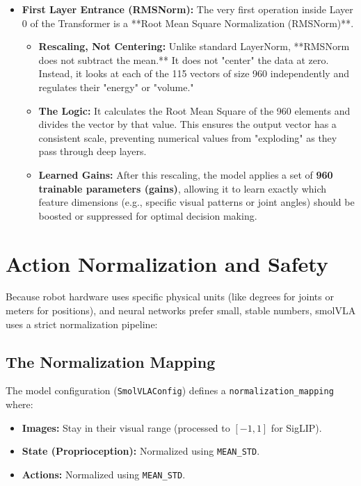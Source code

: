 \documentclass[11pt,a4paper]{article}
\begin{document}
\begin{itemize}
\begin{itemize}
    \end{itemize}
    \item \textbf{First Layer Entrance (RMSNorm):} The very first operation inside Layer 0 of the Transformer is a **Root Mean Square Normalization (RMSNorm)**.
    \begin{itemize}
        \item \textbf{Rescaling, Not Centering:} Unlike standard LayerNorm, **RMSNorm does not subtract the mean.** It does not "center" the data at zero. Instead, it looks at each of the 115 vectors of size 960 independently and regulates their "energy" or "volume."
        \item \textbf{The Logic:} It calculates the Root Mean Square of the 960 elements and divides the vector by that value. This ensures the output vector has a consistent scale, preventing numerical values from "exploding" as they pass through deep layers.
        \item \textbf{Learned Gains:} After this rescaling, the model applies a set of \textbf{960 trainable parameters (gains)}, allowing it to learn exactly which feature dimensions (e.g., specific visual patterns or joint angles) should be boosted or suppressed for optimal decision making.
    \end{itemize}
\end{itemize}

\section{Action Normalization and Safety}
Because robot hardware uses specific physical units (like degrees for joints or meters for positions), and neural networks prefer small, stable numbers, smolVLA uses a strict normalization pipeline:

\subsection{The Normalization Mapping}
The model configuration (\texttt{SmolVLAConfig}) defines a \texttt{normalization\_mapping} where:
\begin{itemize}
    \item \textbf{Images:} Stay in their visual range (processed to $[-1, 1]$ for SigLIP).
    \item \textbf{State (Proprioception):} Normalized using \texttt{MEAN\_STD}.
    \item \textbf{Actions:} Normalized using \texttt{MEAN\_STD}.
\end{itemize}
\end{document}
